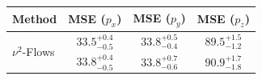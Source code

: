     \begin{tabular}{lccc}
        \toprule
        Method & MSE ($p_x$) & MSE ($p_y$) & MSE ($p_z$) \\
        \midrule
         \multirow{2}{*}{$\nu^2$-Flows}& $33.5_{-0.5}^{+0.4}$ & $33.8_{-0.4}^{+0.5}$ & $89.5_{-1.2}^{+1.5}$ \\
         & $33.8_{-0.5}^{+0.4}$ & $33.8_{-0.6}^{+0.7}$ & $90.9_{-1.8}^{+1.7}$ \\
        \midrule
        \bottomrule
    \end{tabular}
